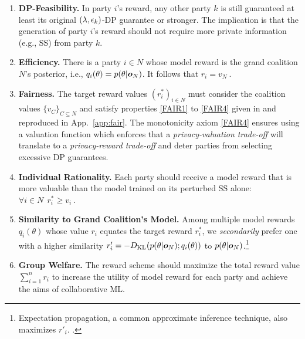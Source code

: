 \documentclass{article}
\theoremstyle{plain}
\theoremstyle{definition}
\theoremstyle{remark}
\begin{document}
\begin{enumerate}[label=P\arabic*,leftmargin=*,itemsep=4pt,topsep=0pt,parsep=0pt,partopsep=0pt]
    \item \label{dp-feasibility} \textbf{DP-Feasibility.} In party $i$'s reward, any other party $k$ is still guaranteed at least its original $(\lambda,{\epsilon}_k)$-DP guarantee or stronger. 
    The implication is that the generation of party $i$'s reward should not require more private information (e.g., SS) from party $k$.
    
    \item \label{efficiency} \textbf{Efficiency.} There is a party $i \in N$ whose model reward is the grand coalition $N$'s posterior, i.e., $q_i(\theta) = p({\theta | {\bm{o}}_N})$. It follows that $r_i = v_N\ .$ 

    \item\label{fairness} \textbf{Fairness.} The target reward values $(r^*_i)_{i \in N}$ must consider the coalition values $\{v_C\}_{C \subseteq N}$ and satisfy properties \ref{FAIR1} to \ref{FAIR4} given in \cite{simcollaborative} and reproduced in App.~\ref{app:fair}. %
    The monotonicity axiom \ref{FAIR4} ensures using a valuation function which enforces that a 
    \emph{privacy-valuation trade-off} 
    will translate to a \emph{privacy-reward trade-off} and deter parties from selecting excessive DP guarantees.

    \item \label{rational} \textbf{Individual Rationality.} Each party should receive a model reward that is more valuable than the model trained on its perturbed SS alone:
    ${\forall i \in N}\ \ r^*_i \geq v_i\ .$
    
    \item \label{similarity} \textbf{Similarity to Grand Coalition's Model.} Among multiple model rewards $q_i(\theta)$ whose value $r_i$ equates the target reward $r^*_i$, we 
    \emph{secondarily}
    prefer one with a higher similarity $r'_i = -D_{\mathrm{KL}}\hspace{-0.5mm}\left(p(\theta | {\bm{o}}_N);q_i(\theta)\right)$ to $p(\theta | {\bm{o}}_N)$.\footnote{Expectation propagation, a common approximate inference technique, also maximizes $r'_i$. \cite{bishop2006pattern}.}

    \item \label{group-welfare} \textbf{Group Welfare.} 
    The reward scheme should maximize the total reward value $\sum^n_{i=1} r_i$ to increase the utility of model reward for each party and achieve the aims of collaborative ML.
\end{enumerate}
\end{document}
